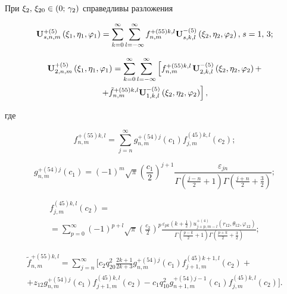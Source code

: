 \begin{theorem}
При ${\xi _2},{\mkern 1mu} {\kern 1pt} {\xi _{20}} \in (0;{\mkern 1mu} {\kern 1pt} {\gamma _2})$ справедливы разложения

\begin{equation}\label{eq:1:46}
{\bf{U}}_{s,n,m}^{ + (5)}\left( {{\xi _1},{\eta _1},{\varphi _1}} \right) = \sum\limits_{k = 0}^\infty  {\sum\limits_{l =  - \infty }^\infty  {f_{n,m}^{ + (55)k,l}} } {\bf{U}}_{s,k,l}^{ - (5)}\left( {{\xi _2},{\eta _2},{\varphi _2}} \right), {\kern 1pt} s = 1,{\mkern 1mu} {\kern 1pt} 3;
\end{equation}

\begin{multline}\label{eq:1:47}
{\bf{U}}_{2,n,m}^{ + (5)}\left( {{\xi _1},{\eta _1},{\varphi _1}} \right) = \sum\limits_{k = 0}^\infty  {\sum\limits_{l =  - \infty }^\infty  {\left[ {f_{n,m}^{ + (55)k,l}} \right.} } {\bf{U}}_{2,k,l}^{ - (5)}\left( {{\xi _2},{\eta _2},{\varphi _2}} \right) + \\
\left. { + \tilde f_{n,m}^{ + (55)k,l}{\bf{U}}_{1,k,l}^{ - (5)}\left( {{\xi _2},{\eta _2},{\varphi _2}} \right)} \right],
\end{multline}

\noindent где

\begin{equation}\label{eq:1:48}
f_{n,m}^{ + (55)k,l} = \sum\limits_{j = n}^\infty  {g_{n,m}^{ + (54)j}} ({c_1})f_{j,m}^{(45)k,l}({c_2});
\end{equation}

\begin{equation}\label{eq:1:49}
g_{n,m}^{ + (54)j}({c_1}) = {( - 1)^m}\sqrt \pi  {\left( {\frac{{{c_1}}}{2}} \right)^{j + 1}}\frac{{{\varepsilon _{jn}}}}{{\Gamma \left( {\frac{{j - n}}{2} + 1} \right)\Gamma \left( {\frac{{j + n}}{2} + \frac{3}{2}} \right)}};
\end{equation}

\begin{multline}\label{eq:1:50}
f_{j,m}^{(45)k,l}({c_2}) = \\
= \sum\limits_{p = 0}^\infty  {{{( - 1)}^{p + l}}} \sqrt \pi  {\left( {\frac{{{c_2}}}{2}} \right)^p}\frac{{{\varepsilon _{pk}}\left( {k + \frac{1}{2}} \right)u_{j + p,m - l}^{ + (4)}\left( {{r_{12}},{\theta _{12}},{\varphi _{12}}} \right)}}{{\Gamma \left( {\frac{{p - k}}{2} + 1} \right)\Gamma \left( {\frac{{p + k}}{2} + \frac{3}{2}} \right)}};
\end{multline}

\begin{multline}\label{eq:1:51}
\tilde f_{n,m}^{ + (55)k,l} = \sum\limits_{j = n}^\infty \bigg[ {c_2}q_{20}^2\frac{{2k + 1}}{{2k + 3}}g_{n,m}^{ + (54)j}({c_1})f_{j + 1,m}^{(45)k + 1,l}({c_2}) + \\
+ {z_{12}}g_{n,m}^{ + (54)j}({c_1})f_{j + 1,m}^{(45)k,l}({c_2}) - {{c_1}q_{10}^2g_{n + 1,m}^{ + (54)j - 1}({c_1})f_{j,m}^{(45)k,l}({c_2})} \bigg].
\end{multline}


\end{theorem}
